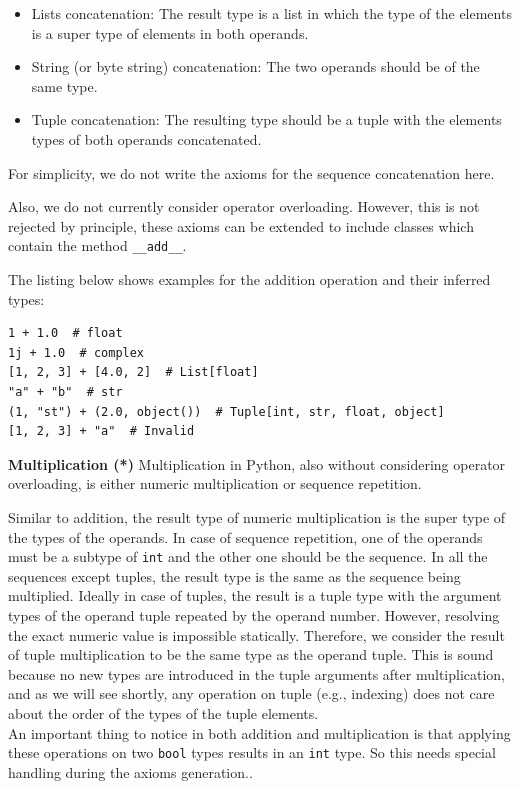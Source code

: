 \begin{itemize}
	\item Lists concatenation: The result type is a list in which the type of the elements is a super type of elements in both operands.
	\item String (or byte string) concatenation: The two operands should be of the same type.
	\item Tuple concatenation: The resulting type should be a tuple with the elements types of both operands concatenated.
\end{itemize}

For simplicity, we do not write the axioms for the sequence concatenation here.

Also, we do not currently consider operator overloading. However, this is not rejected by principle, these axioms can be extended to include classes which contain the method \lstinline|__add__|.

The listing below shows examples for the addition operation and their inferred types:

\begin{lstlisting}
1 + 1.0  # float
1j + 1.0  # complex
[1, 2, 3] + [4.0, 2]  # List[float]
"a" + "b"  # str
(1, "st") + (2.0, object())  # Tuple[int, str, float, object]
[1, 2, 3] + "a"  # Invalid
\end{lstlisting}

\textbf{Multiplication (*)}
Multiplication in Python, also without considering operator overloading, is either numeric multiplication or sequence repetition.

Similar to addition, the result type of numeric multiplication is the super type of the types of the operands. In case of sequence repetition, one of the operands must be a subtype of \lstinline|int| and the other one should be the sequence. In all the sequences except tuples, the result type is the same as the sequence being multiplied. Ideally in case of tuples, the result is a tuple type with the argument types of the operand tuple repeated by the operand number. However, resolving the exact numeric value is impossible statically. Therefore, we consider the result of tuple multiplication to be the same type as the operand tuple. This is sound because no new types are introduced in the tuple arguments after multiplication, and as we will see shortly, any operation on tuple (e.g., indexing) does not care about the order of the types of the tuple elements.\\

An important thing to notice in both addition and multiplication is that applying these operations on two \lstinline|bool| types results in an \lstinline|int| type. So this needs special handling during the axioms generation..

